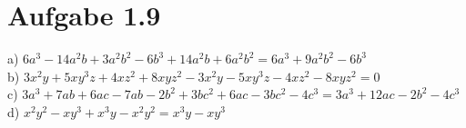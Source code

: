 \documentclass[a4paper, 10pt]{scrartcl}
\begin{document}
\section{Aufgabe 1.9}

a) $6a^{3} - 14a^{2}b + 3a^{2}b^{2} - 6b^{3} + 14a^{2}b + 6a^{2}b^{2} = 6a^{3} + 9a^{2}b^{2} - 6b^{3}$\\
b) $3x^{2}y + 5xy^{3}z + 4xz^{2} + 8xyz^{2} - 3x^{2}y - 5xy^{3}z - 4xz^{2} - 8xyz^{2} = 0$\\
c) $3a^{3} + 7ab + 6ac - 7ab - 2b^{2} + 3bc^{2} + 6ac - 3bc^{2} - 4c^{3} = 3a^{3} + 12ac - 2b^{2} - 4c^{3}$\\
d) $x^{2}y^{2} - xy^{3} + x^{3}y - x^{2}y^{2} = x^{3}y - xy^{3}$\\
\end{document}
